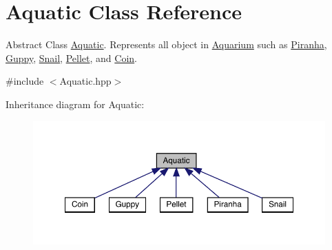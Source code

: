 \hypertarget{class_aquatic}{}\section{Aquatic Class Reference}
\label{class_aquatic}


Abstract Class \mbox{\hyperlink{class_aquatic}{Aquatic}}. Represents all object in \mbox{\hyperlink{class_aquarium}{Aquarium}} such as \mbox{\hyperlink{class_piranha}{Piranha}}, \mbox{\hyperlink{class_guppy}{Guppy}}, \mbox{\hyperlink{class_snail}{Snail}}, \mbox{\hyperlink{class_pellet}{Pellet}}, and \mbox{\hyperlink{class_coin}{Coin}}.  




{\ttfamily \#include $<$Aquatic.\+hpp$>$}



Inheritance diagram for Aquatic\+:\nopagebreak
\begin{figure}[H]
\begin{center}
\leavevmode
\includegraphics[width=350pt]{class_aquatic__inherit__graph}
\end{center}
\end{figure}
